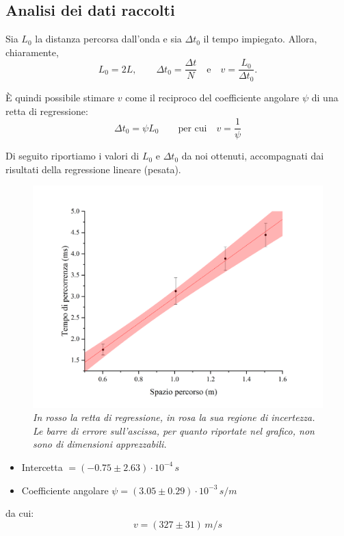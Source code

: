 \documentclass{article}
\begin{document}
\subsection{Analisi dei dati raccolti}

Sia $L_0$ la distanza percorsa dall'onda e sia $\Delta t_0$ il tempo
impiegato. Allora, chiaramente,
\[
  L_0 = 2L,
  \qquad
  \Delta t_0 = \frac{\Delta t}{N}
  \quad\text{e}\quad
  v = \frac{L_0}{\Delta t_0}.
\]

È quindi possibile stimare $v$ come il reciproco del coefficiente
angolare $\psi$ di una retta di regressione:
\[
  \Delta t_0 = \psi L_0
  \qquad\text{per cui}\quad v = \frac{1}{\psi}
\]

Di seguito riportiamo i valori di $L_0$ e $\Delta t_0$ da noi ottenuti,
accompagnati dai risultati della regressione lineare (pesata).

\begin{figure}[H]
  \includegraphics[trim={2.5cm 0.7cm 3cm 2cm},clip,width=\textwidth]{img/Graph2.png}
  \caption*{\emph{
    In rosso la retta di regressione, in rosa la sua regione di incertezza.
    Le barre di errore sull'ascissa, per quanto riportate nel grafico, non
    sono di dimensioni apprezzabili.
  }}
\end{figure}

\begin{itemize}
  \item Intercetta $= (-0.75 \pm 2.63)\cdot 10^{-4}\,\unit{s}$
  \item Coefficiente angolare $\psi = (3.05\pm0.29)\cdot 10^{-3}\,\unit{s\per m}$
\end{itemize}
da cui:
\[ v = (327 \pm 31)\,\unit{m \per s} \]
\end{document}
